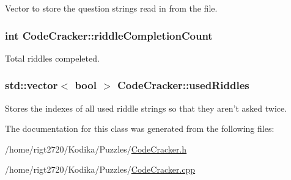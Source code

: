 Vector to store the question strings read in from the file. 

\hypertarget{classCodeCracker_aca60d7cc01bda0ec6782984e46b9b357}{
\subsubsection[{riddle\-Completion\-Count}]{\setlength{\rightskip}{0pt plus 5cm}int Code\-Cracker\-::riddle\-Completion\-Count\hspace{0.3cm}{\ttfamily [private]}}}\label{classCodeCracker_aca60d7cc01bda0ec6782984e46b9b357}


Total riddles compeleted. 

\hypertarget{classCodeCracker_ab5121bae8b22dc3fcf3f8995c1a9a425}{
\subsubsection[{used\-Riddles}]{\setlength{\rightskip}{0pt plus 5cm}std\-::vector$<$ bool $>$ Code\-Cracker\-::used\-Riddles\hspace{0.3cm}{\ttfamily [private]}}}\label{classCodeCracker_ab5121bae8b22dc3fcf3f8995c1a9a425}
Stores the indexes of all used riddle strings so that they aren't asked twice. 

The documentation for this class was generated from the following files\-:\begin{DoxyCompactItemize}
\item 
/home/rigt2720/\-Kodika/\-Puzzles/\hyperlink{CodeCracker_8h}{Code\-Cracker.\-h}\item 
/home/rigt2720/\-Kodika/\-Puzzles/\hyperlink{CodeCracker_8cpp}{Code\-Cracker.\-cpp}\end{DoxyCompactItemize}

